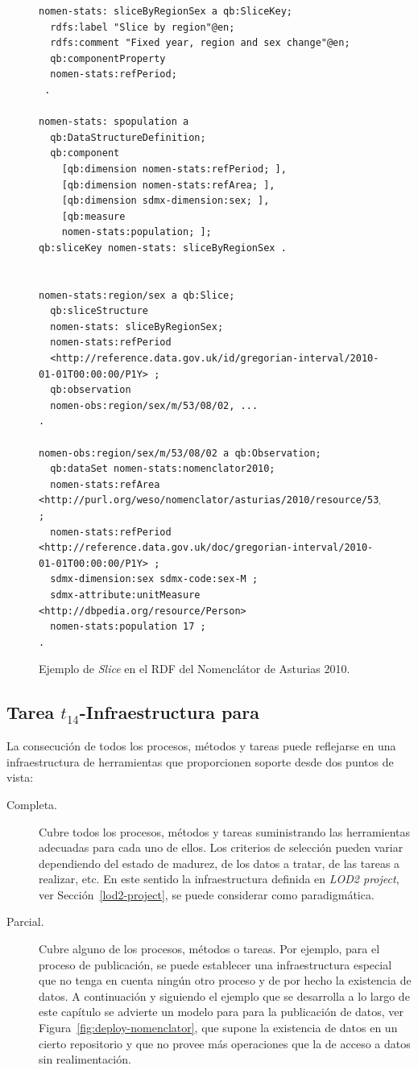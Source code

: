 \begin{figure}[!htp]
\begin{lstlisting} 
nomen-stats: sliceByRegionSex a qb:SliceKey;
  rdfs:label "Slice by region"@en;
  rdfs:comment "Fixed year, region and sex change"@en;
  qb:componentProperty
  nomen-stats:refPeriod; 
 .

nomen-stats: spopulation a
  qb:DataStructureDefinition;
  qb:component
    [qb:dimension nomen-stats:refPeriod; ],
    [qb:dimension nomen-stats:refArea; ],
    [qb:dimension sdmx-dimension:sex; ],
    [qb:measure
    nomen-stats:population; ];
qb:sliceKey nomen-stats: sliceByRegionSex .


nomen-stats:region/sex a qb:Slice;
  qb:sliceStructure
  nomen-stats: sliceByRegionSex;
  nomen-stats:refPeriod
  <http://reference.data.gov.uk/id/gregorian-interval/2010-01-01T00:00:00/P1Y> ;
  qb:observation
  nomen-obs:region/sex/m/53/08/02, ...
.

nomen-obs:region/sex/m/53/08/02 a qb:Observation;
  qb:dataSet nomen-stats:nomenclator2010;
  nomen-stats:refArea <http://purl.org/weso/nomenclator/asturias/2010/resource/53/08/02> ;
  nomen-stats:refPeriod <http://reference.data.gov.uk/doc/gregorian-interval/2010-01-01T00:00:00/P1Y> ;
  sdmx-dimension:sex sdmx-code:sex-M ;
  sdmx-attribute:unitMeasure <http://dbpedia.org/resource/Person>
  nomen-stats:population 17 ; 
.

\end{lstlisting}
	\caption{Ejemplo de \textit{Slice} en el \dataset RDF del Nomenclátor de Asturias 2010.}
	\label{fig:slice-nomen}
\end{figure}



\subsection{Tarea $t_{14}$-Infraestructura para \linkeddata}
La consecución de todos los procesos, métodos y tareas puede reflejarse en una infraestructura
de herramientas que proporcionen soporte desde dos puntos de vista:

\begin{description}
 \item [Completa.] Cubre todos los procesos, métodos y tareas suministrando las herramientas
adecuadas para cada uno de ellos. Los criterios de selección pueden variar dependiendo
del estado de madurez, de los datos a tratar, de las tareas a realizar, etc. En este sentido
la infraestructura definida en \textit{LOD2 project}, ver Sección~\ref{lod2-project}, se puede
considerar como paradigmática.
\item [Parcial.] Cubre alguno de los procesos, métodos o tareas. Por ejemplo, para el proceso
de publicación, se puede establecer una infraestructura especial que no tenga en cuenta ningún
otro proceso y de por hecho la existencia de datos. A continuación y siguiendo el ejemplo que se desarrolla a lo largo de este capítulo se advierte 
un modelo para para la publicación de datos, ver Figura~\ref{fig:deploy-nomenclator}, que 
supone la existencia de datos en un cierto repositorio y que no provee más operaciones
que la de acceso a datos sin realimentación.
\end{description}

